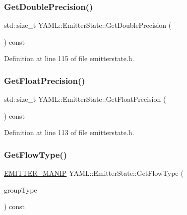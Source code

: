 \subsubsection{\texorpdfstring{GetDoublePrecision()}{GetDoublePrecision()}}
{\footnotesize\ttfamily std\+::size\+\_\+t Y\+A\+M\+L\+::\+Emitter\+State\+::\+Get\+Double\+Precision (\begin{DoxyParamCaption}{ }\end{DoxyParamCaption}) const\hspace{0.3cm}{\ttfamily [inline]}}



Definition at line 115 of file emitterstate.\+h.

\mbox{\label{class_y_a_m_l_1_1_emitter_state_aefd02d2539f0f15d86727046c592aa91}} 
\subsubsection{\texorpdfstring{GetFloatPrecision()}{GetFloatPrecision()}}
{\footnotesize\ttfamily std\+::size\+\_\+t Y\+A\+M\+L\+::\+Emitter\+State\+::\+Get\+Float\+Precision (\begin{DoxyParamCaption}{ }\end{DoxyParamCaption}) const\hspace{0.3cm}{\ttfamily [inline]}}



Definition at line 113 of file emitterstate.\+h.

\mbox{\label{class_y_a_m_l_1_1_emitter_state_a45e041721ad2817c8a72d00bb6883de7}} 
\subsubsection{\texorpdfstring{GetFlowType()}{GetFlowType()}}
{\footnotesize\ttfamily \mbox{\hyperlink{namespace_y_a_m_l_a67c320aa50d3de7ecba1d0b8775dd684}{E\+M\+I\+T\+T\+E\+R\+\_\+\+M\+A\+N\+IP}} Y\+A\+M\+L\+::\+Emitter\+State\+::\+Get\+Flow\+Type (\begin{DoxyParamCaption}\item[{\mbox{\hyperlink{struct_y_a_m_l_1_1_group_type_aab9271cd8999a6694cb10670e6a5496f}{Group\+Type\+::value}}}]{group\+Type }\end{DoxyParamCaption}) const}



